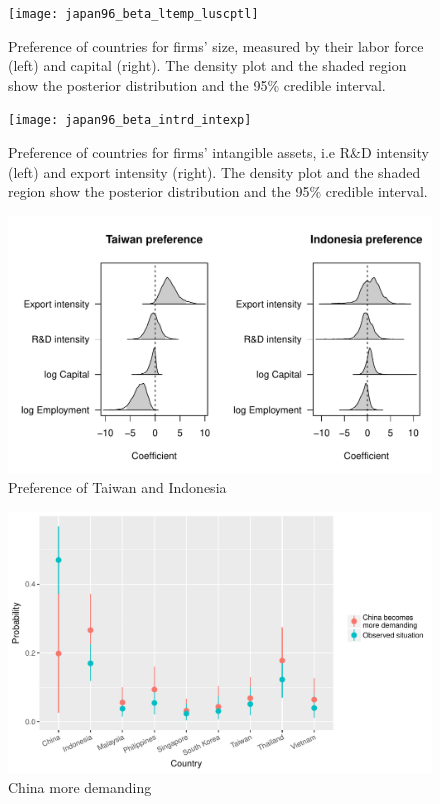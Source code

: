 \begin{figure}[tbp] \centering
  \texttt{[image: japan96\_beta\_ltemp\_luscptl]}
  \caption{Preference of countries for firms' size, measured by their labor
    force (left) and capital (right). The density plot and the shaded region
    show the posterior distribution and the 95\% credible interval.}
  \label{fig:japan96_beta_ltemp_luscptl}
\end{figure}

\begin{figure}[!ht] \centering
  \texttt{[image: japan96\_beta\_intrd\_intexp]}
  \caption{Preference of countries for firms' intangible assets, i.e R\&D
    intensity (left) and export intensity (right). The density plot and the
    shaded region show the posterior distribution and the 95\% credible
    interval.}
  \label{fig:japan96_beta_intrd_intexp}
\end{figure}

\begin{figure}[!ht]
  \centering
  \includegraphics[width=\textwidth,keepaspectratio]{../figure/japan96_beta_Taiwan_Indonesia}
  \caption{Preference of Taiwan and Indonesia}
  \label{fig:japan96_beta_Taiwan_Indonesia}
\end{figure}



\begin{figure}[!ht]
  \centering
  \includegraphics[width=\textwidth,keepaspectratio]{../figure/japan96_sim_china_more_demanding}
  \caption{China more demanding}
  \label{fig:japan96_sim_china_more_demanding}
\end{figure}


